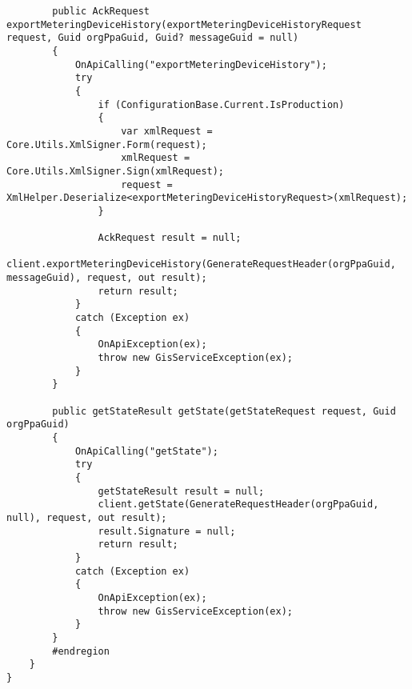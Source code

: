 \begin{lstlisting}
        public AckRequest exportMeteringDeviceHistory(exportMeteringDeviceHistoryRequest request, Guid orgPpaGuid, Guid? messageGuid = null)
        {
            OnApiCalling("exportMeteringDeviceHistory");
            try
            {
                if (ConfigurationBase.Current.IsProduction)
                {
                    var xmlRequest = Core.Utils.XmlSigner.Form(request);
                    xmlRequest = Core.Utils.XmlSigner.Sign(xmlRequest);
                    request = XmlHelper.Deserialize<exportMeteringDeviceHistoryRequest>(xmlRequest);
                }

                AckRequest result = null;
                client.exportMeteringDeviceHistory(GenerateRequestHeader(orgPpaGuid, messageGuid), request, out result);
                return result;
            }
            catch (Exception ex)
            {
                OnApiException(ex);
                throw new GisServiceException(ex);
            }
        }

        public getStateResult getState(getStateRequest request, Guid orgPpaGuid)
        {
            OnApiCalling("getState");
            try
            {
                getStateResult result = null;
                client.getState(GenerateRequestHeader(orgPpaGuid, null), request, out result);
                result.Signature = null;
                return result;
            }
            catch (Exception ex)
            {
                OnApiException(ex);
                throw new GisServiceException(ex);
            }
        }
        #endregion
    }
}
\end{lstlisting}

